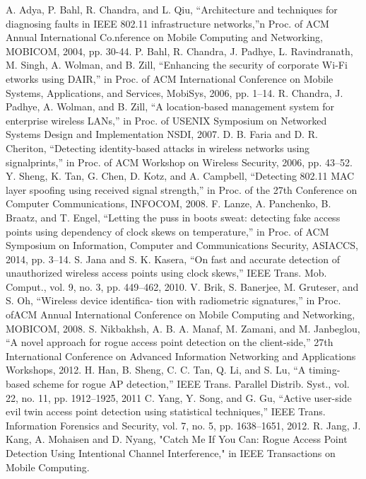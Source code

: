 \documentclass[conference]{IEEEtran}
\begin{document}
\begin{thebibliography}{00}
 A. Adya, P. Bahl, R. Chandra, and L. Qiu, “Architecture and techniques for diagnosing faults in IEEE 802.11 infrastructure networks,”n Proc. of ACM Annual International Co.nference on Mobile Computing and Networking, MOBICOM, 2004, pp. 30-44.
 P. Bahl, R. Chandra, J. Padhye, L. Ravindranath, M. Singh, A. Wolman, and B. Zill, “Enhancing the security of corporate Wi-Fi etworks using DAIR,” in Proc. of ACM International Conference on Mobile Systems, Applications, and Services, MobiSys, 2006, pp. 1–14.
 R. Chandra, J. Padhye, A. Wolman, and B. Zill, “A location-based management system for enterprise wireless LANs,” in Proc. of USENIX Symposium on Networked Systems Design and Implementation NSDI, 2007.
 D. B. Faria and D. R. Cheriton, “Detecting identity-based attacks in wireless networks using signalprints,” in Proc. of ACM Workshop on Wireless Security, 2006, pp. 43–52.
 Y. Sheng, K. Tan, G. Chen, D. Kotz, and A. Campbell, “Detecting 802.11 MAC layer spoofing using received signal strength,” in Proc. of the 27th Conference on Computer Communications, INFOCOM, 2008.
 F. Lanze, A. Panchenko, B. Braatz, and T. Engel, “Letting the puss in boots sweat: detecting fake access points using dependency of clock skews on temperature,” in Proc. of ACM Symposium on Information, Computer and Communications Security, ASIACCS, 2014, pp. 3–14.
 S. Jana and S. K. Kasera, “On fast and accurate detection of unauthorized wireless access points using clock skews,” IEEE Trans. Mob. Comput., vol. 9, no. 3, pp. 449–462, 2010.
 V. Brik, S. Banerjee, M. Gruteser, and S. Oh, “Wireless device identifica- tion with radiometric signatures,” in Proc. ofACM Annual International Conference on Mobile Computing and Networking, MOBICOM, 2008.
 S. Nikbakhsh, A. B. A. Manaf, M. Zamani, and M. Janbeglou, “A novel approach for rogue access point detection on the client-side,” 27th International Conference on Advanced Information Networking and Applications Workshops, 2012.
 H. Han, B. Sheng, C. C. Tan, Q. Li, and S. Lu, “A timing-based scheme for rogue AP detection,” IEEE Trans. Parallel Distrib. Syst., vol. 22, no. 11, pp. 1912–1925, 2011
 C. Yang, Y. Song, and G. Gu, “Active user-side evil twin access point detection using statistical techniques,” IEEE Trans. Information Forensics and Security, vol. 7, no. 5, pp. 1638–1651, 2012.
 R. Jang, J. Kang, A. Mohaisen and D. Nyang, "Catch Me If You Can: Rogue Access Point Detection Using Intentional Channel Interference," in IEEE Transactions on Mobile Computing.

\end{thebibliography}
\vspace{12pt}
\end{document}
